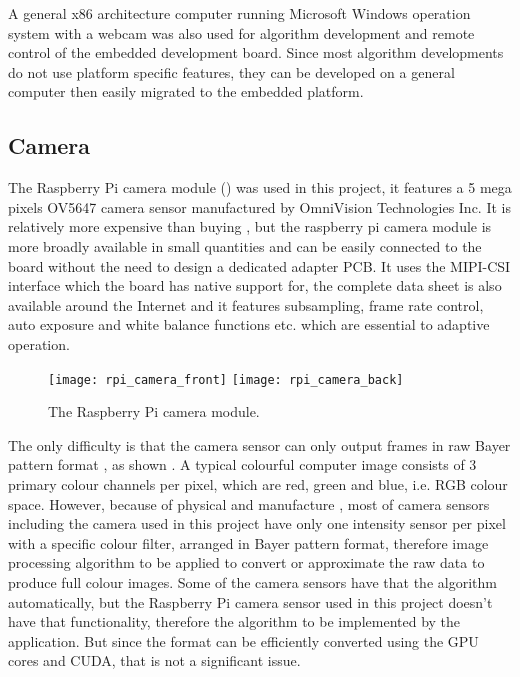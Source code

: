 
A general x86 architecture computer running Microsoft Windows operation system with a webcam was also used for algorithm development and remote control of the embedded development board. Since most algorithm developments do not use platform specific features, they can be developed on a general computer then easily migrated to the embedded platform.

\subsection{Camera}


The Raspberry Pi camera module () was used in this project, it features a 5 mega pixels OV5647 camera sensor manufactured by OmniVision Technologies Inc. It is relatively more expensive than buying , but the raspberry pi camera module is more broadly available in small quantities and can be easily connected to the board without the need to design a dedicated adapter PCB. It uses the MIPI-CSI interface which the board has native support for, the complete data sheet is also available around the Internet and it features subsampling, frame rate control, auto exposure and white balance functions etc. which are essential to adaptive operation.

\begin{figure}[htb]
  \centering
  \texttt{[image: rpi\_camera\_front]}
  \texttt{[image: rpi\_camera\_back]}
  \caption{The Raspberry Pi camera module.}
  \label{des:cam}
\end{figure}

The only difficulty is that the camera sensor can only output frames in raw Bayer pattern format \cite{bayer1976color}, as shown  . A typical colourful computer image consists of 3 primary colour channels per pixel, which are red, green and blue, i.e. RGB colour space. However, because of physical and manufacture , most of camera sensors including the camera used in this project have only one intensity sensor per pixel with a specific colour filter, arranged in Bayer pattern format, therefore image processing algorithm  to be applied to convert or approximate the raw data to produce full colour images. Some of the camera sensors have  that  the algorithm automatically, but the Raspberry Pi camera sensor used in this project doesn't have that functionality, therefore the algorithm  to be implemented by the application. But since the format can be efficiently converted using the GPU cores and CUDA, that is not a significant issue.

